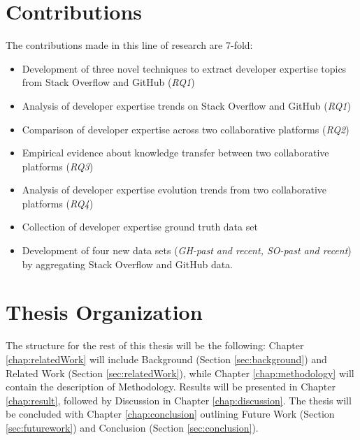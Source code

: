     \section{Contributions\label{sec:contribution}}
        The contributions made in this line of research are 7-fold:
        \begin{itemize}
            \item Development of three novel techniques to extract developer expertise topics from Stack Overflow and GitHub (\emph{RQ1})
            \item Analysis of developer expertise trends on Stack Overflow and GitHub (\emph{RQ1})
            \item Comparison of developer expertise across two collaborative platforms (\emph{RQ2})
            \item Empirical evidence about knowledge transfer between two collaborative platforms (\emph{RQ3})
            \item Analysis of developer expertise evolution trends from two collaborative platforms (\emph{RQ4})
            \item Collection of developer expertise ground truth data set
            \item Development of four new data sets (\emph{GH-past and recent, SO-past and recent}) by aggregating Stack Overflow and GitHub data.
        \end{itemize}
    
     \section{Thesis Organization}
        The structure for the rest of this thesis will be the following: Chapter \ref{chap:relatedWork} will include Background (Section \ref{sec:background}) and Related Work (Section \ref{sec:relatedWork}), while Chapter \ref{chap:methodology} will contain the description of Methodology. Results will be presented in Chapter \ref{chap:result}, followed by Discussion in Chapter \ref{chap:discussion}. The thesis will be concluded with Chapter \ref{chap:conclusion} outlining Future Work (Section \ref{sec:futurework}) and Conclusion (Section \ref{sec:conclusion}).
        
